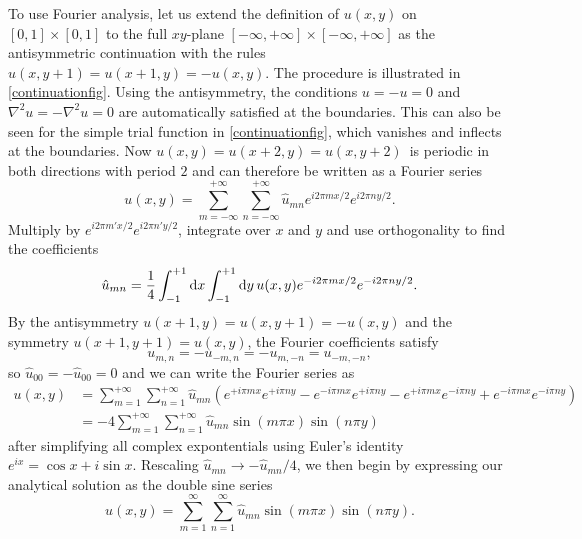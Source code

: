 To use Fourier analysis, let us extend the definition of $u(x,y)$ on $[0,1]\times[0,1]$ to the full $xy$-plane $[-\infty,+\infty]\times[-\infty,+\infty]$ as the antisymmetric continuation with the rules $u(x,y+1) = u(x+1,y) = -u(x,y)$.
The procedure is illustrated in \cref{continuationfig}.
Using the antisymmetry, the conditions $u = -u = 0$ and $\nabla^2 u = -\nabla^2 u = 0$ are automatically satisfied at the boundaries.
This can also be seen for the simple trial function in \cref{continuationfig}, which vanishes and inflects at the boundaries.
Now $u(x,y) = u(x+2,y) = u(x,y+2)$ is periodic in both directions with period $2$ and can therefore be written as a Fourier series \cite{Kreyszig}
\begin{equation*}
	u(x,y) = \sum_{m=-\infty}^{+\infty} \sum_{n=-\infty}^{+\infty} \hat{u}_{mn} e^{i 2 \pi m x / 2} e^{i 2 \pi n y / 2}.
\end{equation*}
Multiply by $e^{i 2 \pi m' x / 2} e^{i 2 \pi n' y / 2}$, integrate over $x$ and $y$ and use orthogonality to find the coefficients
\begin{equation*}
	\hat{u}_{mn} = \frac{1}{4} \integraltwo{u(x,y) e^{-i 2 \pi m x / 2} e^{-i 2 \pi n y / 2}}{x}{y}{-1}{+1}{-1}{+1}.
\end{equation*}
By the antisymmetry $u(x+1,y)=u(x,y+1)=-u(x,y)$ and the symmetry $u(x+1,y+1)=u(x,y)$, the Fourier coefficients satisfy
\begin{equation*}
	u_{m,n} = -u_{-m,n} = -u_{m,-n} = u_{-m,-n},
\end{equation*}
so $\hat{u}_{00} = -\hat{u}_{00} = 0$ and we can write the Fourier series as
\begin{equation*}
\begin{split}
	u(x,y) &= \sum_{m=1}^{+\infty} \sum_{n=1}^{+\infty} \hat{u}_{mn}
	\left( 
	  e^{+i \pi m x} e^{+i \pi n y}
	- e^{-i \pi m x} e^{+i \pi n y}
	- e^{+i \pi m x} e^{-i \pi n y}
	+ e^{-i \pi m x} e^{-i \pi n y}
	\right) \\
	       &= -4 \sum_{m=1}^{+\infty} \sum_{n=1}^{+\infty} \hat{u}_{mn} \sin(m \pi x) \sin(n \pi y)
\end{split}
\end{equation*}
after simplifying all complex expontentials using Euler's identity $e^{ix} = \cos x + i \sin x$.
Rescaling $\hat{u}_{mn} \rightarrow -\hat{u}_{mn}/4$, we then begin by expressing our analytical solution as the double sine series
\newcommand{\fourierseries}[3]{
	\sum_{#2=1}^{\infty} \sum_{#3=1}^{\infty} #1 \sin(#2 \pi x) \sin(#3 \pi y)
}
\newcommand{\fourierexpand}[1]{
	\fourierseries{\hat{#1}_{mn}}{m}{n}
}
\begin{equation}
u(x,y) = \fourierexpand{u}.
\label{pde:equation:fourierexpansion}
\end{equation}

